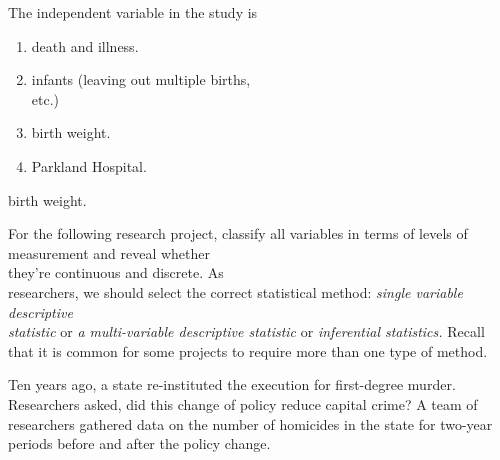 \documentclass[11pt, chapterprefix=true]{scrbook}\usepackage[]{graphicx}\usepackage[]{color}
\begin{document}
\begin{exercises}
\begin{exercise}
    The independent variable in the study is
    \begin{enumerate}
    \samepage
    \item death and illness.
    \samepage
    \item infants (leaving out multiple births, \\ etc.)
    \samepage
    \item birth weight.
    \samepage
    \item Parkland Hospital.
    \end{enumerate}
    \samepage
    \vspace{3mm}

  \end{exercise}
  \vspace{2mm}
  \begin{solution}
    birth weight.
  \end{solution}

\begin{exercise}  %

  For the following research project, classify all variables in terms of levels of measurement and reveal whether \\ they're continuous and discrete.  As \\ researchers, we should select the correct statistical method: {\emph{single variable descriptive \\ statistic}} or {\emph{a multi-variable descriptive  statistic}} or  {\emph{inferential statistics.}}  Recall that it is common for some projects to require more than one type of method.

	  Ten years ago, a state re-instituted the execution for first-degree murder.  Researchers asked, did this change of policy reduce capital crime?  A team of researchers gathered data on the number of homicides in the state for two-year periods before and after the policy change.

    \vspace{3mm}


\end{exercise}
\end{exercises}
\end{document}
